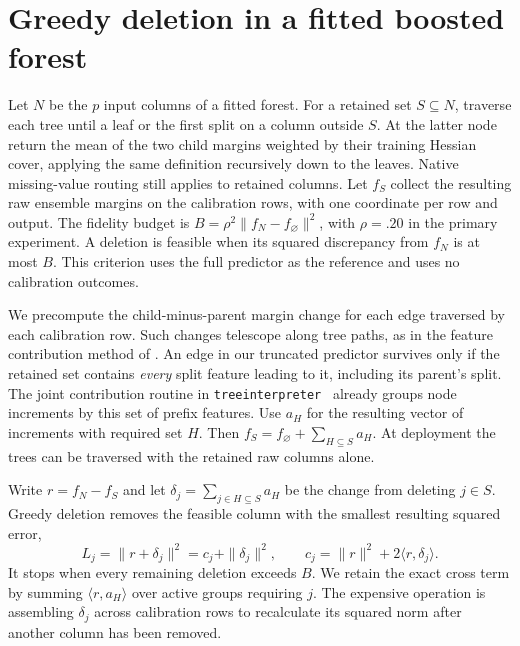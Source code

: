 \section{Greedy deletion in a fitted boosted forest}
\label{sec:tree-minpi}
Let $N$ be the $p$ input columns of a fitted forest. For a retained set
$S\subseteq N$, traverse each tree until a leaf or the first split on a column
outside $S$. At the latter node return the mean of the two child margins
weighted by their training Hessian cover, applying the same definition
recursively down to the leaves. Native missing-value routing still applies to
retained columns. Let $f_S$ collect the resulting raw ensemble margins on the
calibration rows, with one coordinate per row and output. The fidelity budget is
$B=\rho^2\|f_N-f_\varnothing\|^2$, with $\rho=.20$ in the primary experiment.
A deletion is feasible when its squared discrepancy from $f_N$ is at most $B$.
This criterion uses the full predictor as the reference and uses no calibration
outcomes.

We precompute the child-minus-parent margin change for each edge traversed by
each calibration row. Such changes telescope along tree paths, as in the
feature contribution method of \citet{palczewska2013forest}. An edge in our
truncated predictor survives only if the retained set contains \emph{every}
split feature leading to it, including its parent's split. The joint
contribution routine in \texttt{treeinterpreter}~\cite{saabasTreeInterpreter}
already groups node increments by this set of prefix features. Use $a_H$
for the resulting vector of increments with required set $H$.
Then $f_S=f_\varnothing+\sum_{H\subseteq S}a_H$. At deployment the trees can
be traversed with the retained raw columns alone.

Write $r=f_N-f_S$ and let $\delta_j=\sum_{j\in H\subseteq S}a_H$ be the change
from deleting $j\in S$. Greedy deletion removes the feasible column with the
smallest resulting squared error,
\begin{equation}
 L_j=\|r+\delta_j\|^2=c_j+\|\delta_j\|^2,\qquad
 c_j=\|r\|^2+2\langle r,\delta_j\rangle .
 \label{eq:tree-error}
\end{equation}
It stops when every remaining deletion exceeds $B$. We retain the exact cross
term by summing $\langle r,a_H\rangle$ over active groups requiring $j$. The
expensive operation is assembling $\delta_j$ across calibration rows to
recalculate its squared norm after another column has been removed.

